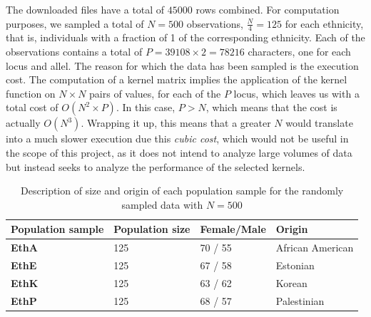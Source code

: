 \documentclass[a4paper, 11pt]{article}
\theoremstyle{definition}
\theoremstyle{remark}
\begin{document}
The downloaded files have a total of $45000$ rows combined. 
For computation purposes, we sampled a total of $N = 500$ observations, $\frac{N}{4} = 125$ for each ethnicity, that is, individuals with a fraction of 1 of the corresponding ethnicity. Each of the observations contains a total of $P = 39108 \times 2 = 78216$ characters, one for each locus and allel.
The reason for which the data has been sampled is the execution cost. The computation of a kernel matrix implies the application of the kernel function on $N\times N$ pairs of values, for each of the $P$ locus, which leaves us with a total cost of $O(N^2\times P)$. In this case, $P > N$, which means that the cost is actually $O(N^3)$. Wrapping it up, this means that a greater $N$ would translate into a much slower execution due this \textit{cubic cost}, which would not be useful in the scope of this project, as it does not intend to analyze large volumes of data but instead seeks to analyze the performance of the selected kernels.

\begin{table}[!h]
\renewcommand{\arraystretch}{1.5}
\centering
\begin{tabular}{llll}
\textbf{Population sample} & \textbf{Population size} & \textbf{Female/Male} & \textbf{Origin} \\ \hline
\textbf{EthA} & 125 & 70 / 55 & African American \\
\textbf{EthE} & 125 & 67 / 58 & Estonian \\
\textbf{EthK} & 125 & 63 / 62 & Korean \\
\textbf{EthP} & 125 & 68 / 57 & Palestinian
\end{tabular}
\caption{Description of size and origin of each population sample for the randomly sampled data with $N=500$}
\end{table}
\end{document}
